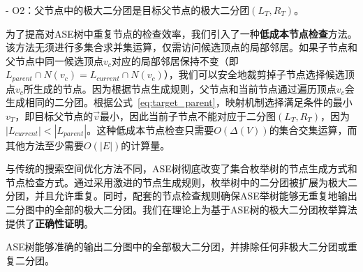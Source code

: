 - O2：父节点中的极大二分团是目标父节点的极大二分团$(L_T, R_T)$。


为了提高对ASE树中重复节点的检查效率，我们引入了一种\textbf{低成本节点检查}方法。该方法无须进行多集合求并集运算，仅需访问候选顶点的局部邻居。如果子节点和父节点中同一候选顶点$v_c$对应的局部邻居保持不变（即$L_{parent} \cap N(v_c) = L_{current} \cap N(v_c)$），我们可以安全地裁剪掉子节点选择候选顶点$v_c$所生成的节点。因为根据节点生成规则，父节点和当前节点通过遍历顶点$v_c$会生成相同的二分团。根据公式~\ref{eq:target_parent}，映射机制选择满足条件的最小$v_T$，即目标父节点的$\vec{v}$最小，因此当前子节点不能对应于二分图$(L_T, R_T)$，因为$|L_{current}|<|L_{parent}|$。这种低成本节点检查只需要$O(\Delta(V))$的集合交集运算，而其他方法至少需要$O(|E|)$的计算量。

与传统的搜索空间优化方法不同，ASE树彻底改变了集合枚举树的节点生成方式和节点检查方式。通过采用激进的节点生成规则，枚举树中的二分团被扩展为极大二分团，并且允许重复。同时，配套的节点检查规则确保ASE举树能够无重复地输出二分图中的全部的极大二分团。我们在理论上为基于ASE树的极大二分团枚举算法提供了\textbf{正确性证明}。


\begin{theorem}
  \label{theorem:correctness}
  ASE树能够准确的输出二分图中的全部极大二分团，并排除任何非极大二分团或重复二分团。
\end{theorem}

